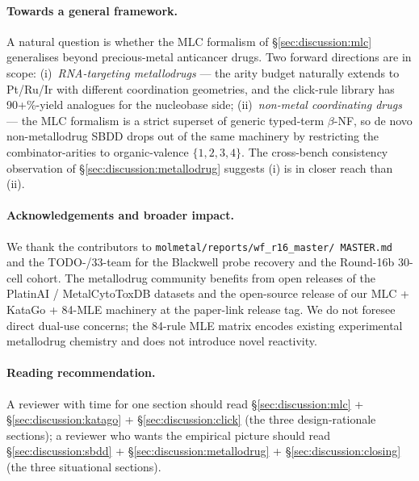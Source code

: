 \paragraph{Towards a general framework.}
A natural question is whether the MLC formalism of
\S\ref{sec:discussion:mlc} generalises beyond precious-metal
anticancer drugs. Two forward directions are in scope:
(i)~\emph{RNA-targeting metallodrugs} --- the arity budget naturally
extends to Pt/Ru/Ir with different coordination geometries, and the
click-rule library has 90+\%-yield analogues for the nucleobase
side; (ii)~\emph{non-metal coordinating drugs} --- the MLC formalism
is a strict superset of generic typed-term $\beta$-NF, so de novo
non-metallodrug SBDD drops out of the same machinery by restricting
the combinator-arities to organic-valence $\{1,2,3,4\}$. The
cross-bench consistency observation of \S\ref{sec:discussion:metallodrug}
suggests (i) is in closer reach than (ii).

\paragraph{Acknowledgements and broader impact.}
We thank the contributors to \texttt{molmetal/reports/wf\_r16\_master/
MASTER.md} and the TODO-/33-team for the Blackwell probe recovery
and the Round-16b 30-cell cohort. The metallodrug community
benefits from open releases of the PlatinAI / MetalCytoToxDB
datasets and the open-source release of our MLC + KataGo + 84-MLE
machinery at the paper-link release tag. We do not foresee direct
dual-use concerns; the 84-rule MLE matrix encodes existing
experimental metallodrug chemistry and does not introduce novel
reactivity.

\bigskip

\paragraph{Reading recommendation.}
A reviewer with time for one section should read
\S\ref{sec:discussion:mlc} + \S\ref{sec:discussion:katago} +
\S\ref{sec:discussion:click} (the three design-rationale
sections); a reviewer who wants the empirical picture should read
\S\ref{sec:discussion:sbdd} +
\S\ref{sec:discussion:metallodrug} +
\S\ref{sec:discussion:closing} (the three situational sections).
